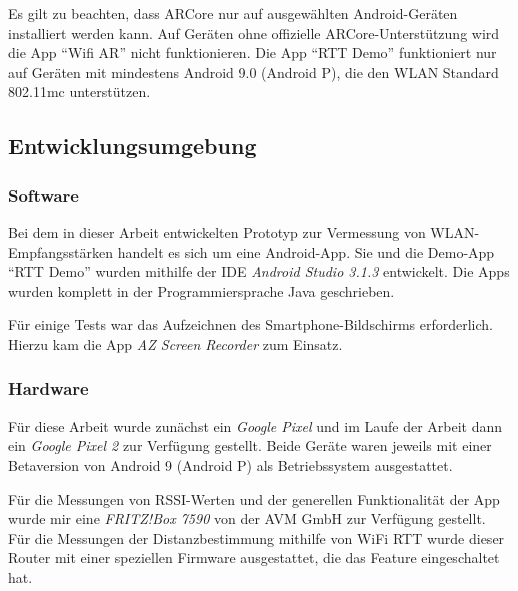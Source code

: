 \documentclass[10pt]{scrartcl}
\begin{document}
Es gilt zu beachten, dass ARCore nur auf ausgewählten Android-Geräten installiert werden kann. Auf Geräten ohne offizielle ARCore-Unterstützung wird die App \enquote{Wifi AR} nicht funktionieren. Die App \enquote{RTT Demo} funktioniert nur auf Geräten mit mindestens Android 9.0 (Android P), die den WLAN Standard 802.11mc unterstützen.
\subsection{Entwicklungsumgebung}
\subsubsection{Software}
Bei dem in dieser Arbeit entwickelten Prototyp zur Vermessung von WLAN-Empfangsstärken handelt es sich um eine Android-App. Sie und die Demo-App \enquote{RTT Demo} wurden mithilfe der IDE \textit{Android Studio 3.1.3} entwickelt. Die Apps wurden komplett in der Programmiersprache Java geschrieben.

Für einige Tests war das Aufzeichnen des Smartphone-Bildschirms erforderlich. Hierzu kam die App \textit{AZ Screen Recorder} \cite{azrecorder} zum Einsatz.

\subsubsection{Hardware}
Für diese Arbeit wurde zunächst ein \textit{Google Pixel} und im Laufe der Arbeit dann ein \textit{Google Pixel 2} zur Verfügung gestellt. Beide Geräte waren jeweils mit einer Betaversion von Android 9 (Android P) als Betriebssystem ausgestattet.

Für die Messungen von RSSI-Werten und der generellen Funktionalität der App wurde mir eine \textit{FRITZ!Box 7590} von der AVM GmbH zur Verfügung gestellt. Für die Messungen der Distanzbestimmung mithilfe von WiFi RTT wurde dieser Router mit einer speziellen Firmware ausgestattet, die das Feature eingeschaltet hat.
\end{document}
